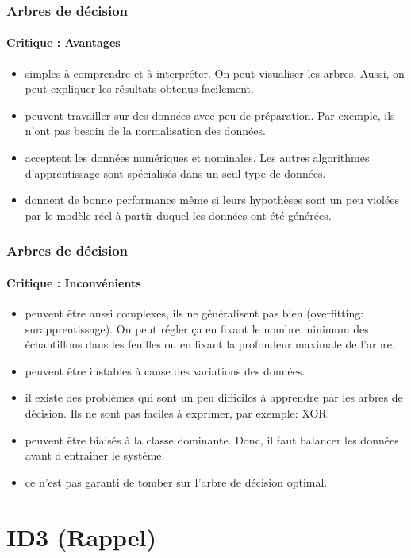 \documentclass[xcolor=table]{beamer}
\begin{document}
\begin{frame}
	\frametitle{Arbres de décision}
	\framesubtitle{Critique : Avantages}
	
	\begin{itemize}
		\item simples à comprendre et à interpréter. On peut visualiser les arbres. Aussi, on peut expliquer les résultats obtenus facilement.
		\item peuvent travailler sur des données avec peu de préparation. Par exemple, ils n'ont pas besoin de la normalisation des données.
		\item acceptent les données numériques et nominales. Les autres algorithmes d'apprentissage sont spécialisés dans un seul type de données.
		\item donnent de bonne performance même si leurs hypothèses sont un peu violées par le modèle réel à partir duquel les données ont été générées.
	\end{itemize}
	
\end{frame}

\begin{frame}
	\frametitle{Arbres de décision}
	\framesubtitle{Critique : Inconvénients}
	
	\begin{itemize}
		\item peuvent être aussi complexes, ils ne généralisent pas bien (overfitting: surapprentissage). On peut régler ça en fixant le nombre minimum des échantillons dans les feuilles ou en fixant la profondeur maximale de l'arbre.
		\item peuvent être instables à cause des variations des données.
		\item il existe des problèmes qui sont un peu difficiles à apprendre par les arbres de décision. Ils ne sont pas faciles à exprimer, par exemple: XOR.
		\item peuvent être biaisés à la classe dominante. Donc, il faut balancer les données avant d'entrainer le système.
		\item ce n'est pas garanti de tomber sur l'arbre de décision optimal.
	\end{itemize}
	
\end{frame}

\section{ID3 (Rappel)}
\end{document}

